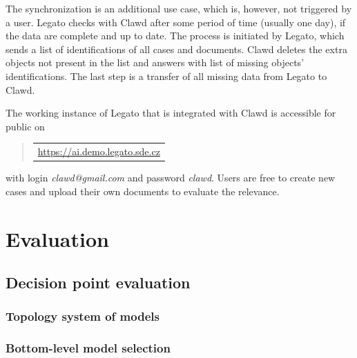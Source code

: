 \documentclass[
  digital, %
  notable,   %
  nolof,     %
  nolot,     %
]{fithesis3}
\begin{document}
The synchronization is an additional use case, which is, however, not triggered by a user.
Legato checks with Clawd after some period of time (usually one day), if the data are complete and up to date.
The process is initiated by Legato, which sends a list of identifications of all cases and documents.
Clawd deletes the extra objects not present in the list and answers with list of missing objects' identifications.
The last step is a transfer of all missing data from Legato to Clawd.

The working instance of Legato that is integrated with Clawd is accessible for public on 
\begin{quote}
\begin{tabular}{|>{\centering\arraybackslash} m{10cm}|}
\hline
\vspace{2mm}
\url{https://ai.demo.legato.sde.cz}
\vspace{2mm}
\hrulefill
\end{tabular}
\end{quote}
with login \textit{clawd@gmail.com} and password \textit{clawd}.
Users are free to create new cases and upload their own documents to evaluate the relevance.



\chapter{Evaluation}
\label{chp:evaluation}

\section{Decision point evaluation}

\subsection{Topology system of models}

\subsection{Bottom-level model selection}
\label{eval:bottom-model-selection}
\end{document}
